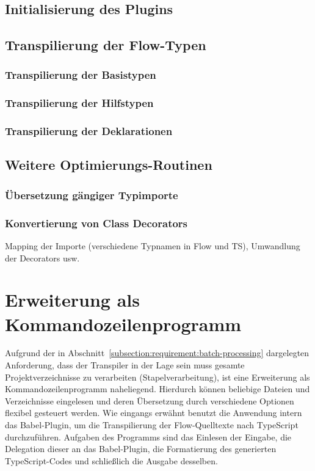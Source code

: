 \subsection{Initialisierung des Plugins}
\subsection{Transpilierung der Flow-Typen}
  \subsubsection{Transpilierung der Basistypen}
  \subsubsection{Transpilierung der Hilfstypen}
  \subsubsection{Transpilierung der Deklarationen}

\subsection{Weitere Optimierungs-Routinen}
  \subsubsection{Übersetzung gängiger Typimporte}
  \subsubsection{Konvertierung von Class Decorators}

Mapping der Importe (verschiedene Typnamen in Flow und TS), Umwandlung der Decorators usw.

\section{Erweiterung als Kommandozeilenprogramm}

Aufgrund der in Abschnitt~\ref{subsection:requirement:batch-processing} dargelegten Anforderung, dass der Transpiler in der Lage sein muss gesamte Projektverzeichnisse zu verarbeiten (Stapelverarbeitung), ist eine Erweiterung als Kommandozeilenprogramm naheliegend. Hierdurch können beliebige Dateien und Verzeichnisse eingelesen und deren Übersetzung durch verschiedene Optionen flexibel gesteuert werden. Wie eingangs erwähnt benutzt die Anwendung intern das Babel-Plugin, um die Transpilierung der Flow-Quelltexte nach TypeScript durchzuführen. Aufgaben des Programms sind das Einlesen der Eingabe, die Delegation dieser an das Babel-Plugin, die Formatierung des generierten TypeScript-Codes und schließlich die Ausgabe desselben.

